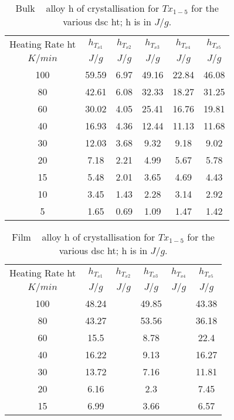 \documentclass[a4paper,12pt,oneside]{article}%
\begin{document}
\begin{table}[h]
	\centering
	\begin{tabular}{ c c c c c c }
		\toprule
		Heating Rate \acrshort{ht} & $h_{T_{x1}}$ & $h_{T_{x2}}$ & $h_{T_{x3}}$ & $h_{T_{x4}}$ & $h_{T_{x5}}$ \\ 
		$K/min$ & $J/g$ & $J/g$ & $J/g$ & $J/g$ & $J/g$ \\
		\midrule
		100  & 59.59 & 6.97 & 49.16 & 22.84 & 46.08 \\
		80   & 42.61 & 6.08 & 32.33 & 18.27 & 31.25 \\
		60   & 30.02 & 4.05 & 25.41 & 16.76 & 19.81 \\
		40   & 16.93 & 4.36 & 12.44 & 11.13 & 11.68 \\
		30   & 12.03 & 3.68 & 9.32  & 9.18  & 9.02  \\
		20   & 7.18  & 2.21 & 4.99  & 5.67  & 5.78  \\
		15   & 5.48  & 2.01 & 3.65  & 4.69  & 4.43  \\
		10   & 3.45  & 1.43 & 2.28  & 3.14  & 2.92  \\
		5    & 1.65  & 0.69 & 1.09  & 1.47  & 1.42  \\
		\bottomrule
	\end{tabular}
	\caption{Bulk \MgZnCa~ alloy \gls{h} of crystallisation for $Tx_{1-5}$ for the various \acrshort{dsc}  \acrshort{ht}; \gls{h} is in $J/g$.}
	\label{tab:Bulk_Enthalpy}
\end{table}

\begin{table}[h]
	\centering
	\begin{tabular}{ c c c c c c }
		\toprule
		Heating Rate \acrshort{ht} & $h_{T_{x1}}$ & $h_{T_{x2}}$ & $h_{T_{x3}}$ & $h_{T_{x4}}$ & $h_{T_{x5}}$ \\ 
		$K/min$ & $J/g$ & $J/g$ & $J/g$ & $J/g$ & $J/g$ \\
		\midrule
		100  & 48.24 &    & 49.85 &    & 43.38 \\
		80   & 43.27 &    & 53.56 &    & 36.18 \\
		60   & 15.5  &    & 8.78  &    & 22.4  \\
		40   & 16.22 &    & 9.13  &    & 16.27 \\
		30   & 13.72 &    & 7.16  &    & 11.81 \\
		20   & 6.16  &    & 2.3   &    & 7.45  \\
		15   & 6.99  &    & 3.66  &    & 6.57  \\
		\bottomrule
	\end{tabular}
	\caption{Film \MgZnCa~ alloy \gls{h} of crystallisation for $Tx_{1-5}$ for the various \acrshort{dsc}  \acrshort{ht}; \gls{h} is in $J/g$.}
	\label{tab:Film_Enthalpy}
\end{table}
\end{document}

